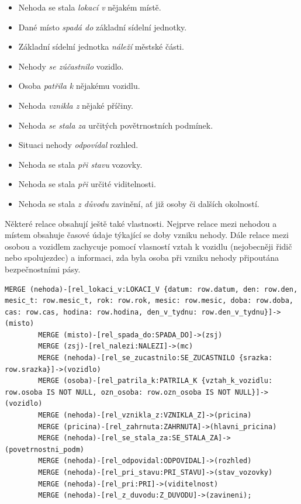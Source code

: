 \documentclass[a4paper, 11pt]{article}
\begin{document}
\begin{enumerate}
    \begin{itemize}
        \item Nehoda se stala \textit{lokací v} nějakém místě.
        \item Dané místo \textit{spadá do} základní sídelní jednotky.
        \item Základní sídelní jednotka \textit{náleží} městské části.
        \item Nehody \textit{se zúčastnilo} vozidlo.
        \item Osoba \textit{patřila k} nějakému vozidlu.
        \item Nehoda \textit{vznikla z} nějaké příčiny.
        \item Nehoda \textit{se stala za} určitých povětrnostních podmínek.
        \item Situaci nehody \textit{odpovídal} rozhled.
        \item Nehoda se stala \textit{při stavu} vozovky.
        \item Nehoda se stala \textit{při} určité viditelnosti.
        \item Nehoda se stala \textit{z důvodu} zavinění, ať již osoby či dalších okolností.
    \end{itemize}

    Některé relace obsahují ještě také vlastnosti. Nejprve relace mezi nehodou a místem obsahuje časové údaje týkající se doby vzniku nehody. Dále relace mezi osobou a vozidlem zachycuje pomocí vlasností vztah k vozidlu (nejobecněji řidič nebo spolujezdec) a informaci, zda byla osoba při vzniku nehody připoutána bezpečnostními pásy.

    \begin{lstlisting}[style=Cypher]
        MERGE (nehoda)-[rel_lokaci_v:LOKACI_V {datum: row.datum, den: row.den, mesic_t: row.mesic_t, rok: row.rok, mesic: row.mesic, doba: row.doba, cas: row.cas, hodina: row.hodina, den_v_tydnu: row.den_v_tydnu}]->(misto)
        MERGE (misto)-[rel_spada_do:SPADA_DO]->(zsj)
        MERGE (zsj)-[rel_nalezi:NALEZI]->(mc)
        MERGE (nehoda)-[rel_se_zucastnilo:SE_ZUCASTNILO {srazka: row.srazka}]->(vozidlo)
        MERGE (osoba)-[rel_patrila_k:PATRILA_K {vztah_k_vozidlu: row.osoba IS NOT NULL, ozn_osoba: row.ozn_osoba IS NOT NULL}]->(vozidlo)
        MERGE (nehoda)-[rel_vznikla_z:VZNIKLA_Z]->(pricina)
        MERGE (pricina)-[rel_zahrnuta:ZAHRNUTA]->(hlavni_pricina)
        MERGE (nehoda)-[rel_se_stala_za:SE_STALA_ZA]->(povetrnostni_podm)
        MERGE (nehoda)-[rel_odpovidal:ODPOVIDAL]->(rozhled)
        MERGE (nehoda)-[rel_pri_stavu:PRI_STAVU]->(stav_vozovky)
        MERGE (nehoda)-[rel_pri:PRI]->(viditelnost)
        MERGE (nehoda)-[rel_z_duvodu:Z_DUVODU]->(zavineni);
    \end{lstlisting}


\end{enumerate}
\end{document}

